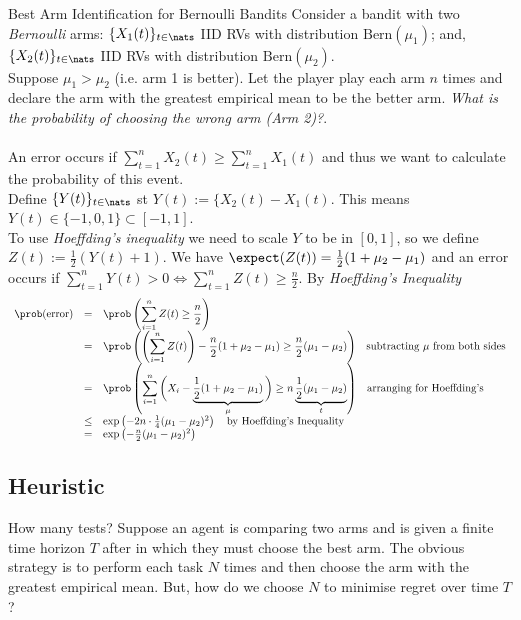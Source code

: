 \documentclass[11pt,a4paper]{article}
\begin{document}
  \begin{example}{Best Arm Identification for Bernoulli Bandits}
    Consider a bandit with two \textit{Bernoulli} arms: $\{X_1(t)\}_{t\in\nats}$ IID RVs with distribution $\text{Bern}(\mu_1)$; and, $\{X_2(t)\}_{t\in\nats}$ IID RVs with distribution $\text{Bern}(\mu_2)$. \\
    Suppose $\mu_1>\mu_2$ (i.e. arm 1 is better). Let the player play each arm $n$ times and declare the arm with the greatest empirical mean to be the better arm. \textit{What is the probability of choosing the wrong arm (Arm 2)?}.\\
    \\
    An error occurs if $\sum_{t=1}^nX_2(t)\geq\sum_{t=1}^nX_1(t)$ and thus we want to calculate the probability of this event.\\
    Define $\{Y(t)\}_{t\in\nats}$ st $Y(t):=\{X_2(t)-X_1(t)$. This means $Y(t)\in\{-1,0,1\}\subset[-1,1]$.\\
    To use \textit{Hoeffding's inequality} we need to scale $Y$ to be in $[0,1]$, so we define $Z(t):=\frac12(Y(t)+1)$. We have $\expect(Z(t))=\frac12(1+\mu_2-\mu_1)$ and an error occurs if $\sum_{t=1}^nY(t)>0\Longleftrightarrow \sum_{t=1}^nZ(t)\geq\frac{n}2$. By \textit{Hoeffding's Inequality}
    \[\begin{array}{rclll}
      \prob(\text{error})&=&\displaystyle\prob\left(\sum_{i=1}^nZ(t)\geq\frac{n}2\right)\\
      &=&{\displaystyle\prob\left(\left(\sum_{i=1}^nZ(t)\right)-\frac{n}2(1+\mu_2-\mu_1)\geq\frac{n}2(\mu_1-\mu_2)\right)}\quad\text{subtracting $\mu$ from both sides}\\
      &=&{\displaystyle\prob\left(\sum_{i=1}^n\bigg(X_i-\underbrace{\frac{1}{2}(1+\mu_2-\mu_1)}_\mu\bigg)\geq n\underbrace{\frac12(\mu_1-\mu_2)}_t\right)}\quad\text{arranging for Hoeffding's}\\
      &\leq&\exp\left(-2n\cdot\frac{1}4(\mu_1-\mu_2)^2\right)\quad\text{by Hoeffding's Inequality}\\
      &=&\exp\left(-\frac{n}2(\mu_1-\mu_2)^2\right)
    \end{array}\]
  \end{example}

\subsection{Heuristic}

  \begin{remark}{How many tests?}
    Suppose an agent is comparing two arms and is given a finite time horizon $T$ after in which they must choose the best arm. The obvious strategy is to perform each task $N$ times and then choose the arm with the greatest empirical mean. But, how do we choose $N$ to minimise regret over time $T$?
  \end{remark}
\end{document}

